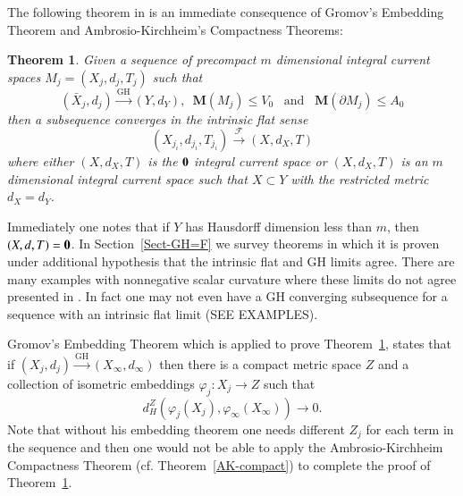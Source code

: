 \documentclass[12pt]{amsart}
\newtheorem{thm}{Theorem}[section]
\begin{document}
The following theorem in \cite{SorWen2} is an immediate consequence
of Gromov's Embedding Theorem and Ambrosio-Kirchheim's Compactness Theorems:

\begin{thm} \label{GH-to-flat}
Given a sequence of precompact $m$ dimensional integral current spaces $M_j=\left(X_j, d_j, T_j\right)$ such that 
\begin{equation}
\left(\bar{X}_{j}, d_{j}\right) {\stackrel { \textrm{GH}}{\longrightarrow} } \left(Y,d_Y\right),\,\,\,
{{\mathbf M}}(M_j)\le V_0 \,\,\,\textrm{ and } \,\,\, {{\mathbf M}}(\partial M_j)\le A_0
\end{equation}
then a subsequence converges 
 in the 
intrinsic flat sense 
\begin{equation}
\left(X_{j_i}, d_{j_i}, T_{j_i}\right) {\stackrel {\mathcal{F}}{\longrightarrow} } \left(X,d_X,T\right)
\end{equation}
where either $\left(X,d_X,T\right)$ is the ${\bf 0}$ integral current space
or $\left(X,d_X,T\right)$ is an $m$ dimensional integral current space
such that  $X \subset Y$ with the restricted metric $d_X=d_Y$.
\end{thm}

Immediately one notes that if $Y$ has Hausdorff dimension less than $m$,
then $(X,d,T)=\bf{0}$.   In Section~\ref{Sect-GH=F} we survey theorems
in which it is proven under additional hypothesis that the intrinsic
flat and GH limits agree.   There are many examples
with nonnegative scalar curvature where these limits do not agree 
presented in \cite{SorWen2}. In fact one may not even have a GH converging subsequence
for a sequence with an intrinsic flat limit (SEE EXAMPLES).

Gromov's Embedding Theorem which is applied to prove Theorem~\ref{GH-to-flat}, 
states that if $\left({X}_{j}, d_{j}\right) {\stackrel { \textrm{GH}}{\longrightarrow} } \left(X_\infty,d_\infty\right)$ then
there is a compact metric space $Z$ and a collection of isometric
embeddings $\varphi_j: X_j \to Z$ such that 
\begin{equation} \label{Gromov-Z}
d_H^Z(\varphi_j(X_j), \varphi_\infty(X_\infty)) \to 0.
\end{equation} 
Note that without his embedding theorem one needs different $Z_j$ for
each term in the sequence and then one would not be able to apply the
Ambrosio-Kirchheim Compactness Theorem 
(cf. Theorem~\ref{AK-compact}) to complete the proof of 
Theorem~\ref{GH-to-flat}.   
\end{document}
